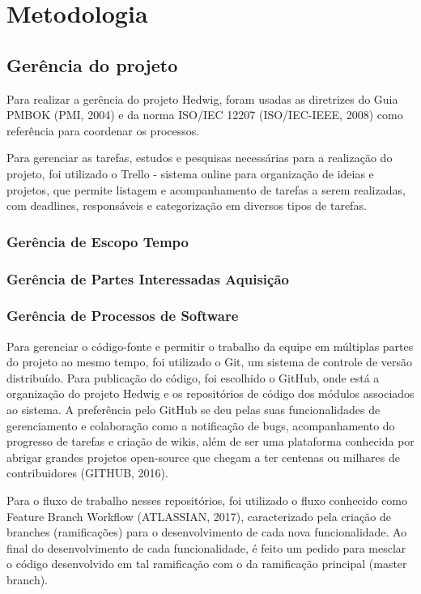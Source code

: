 \chapter{Metodologia}

\section{Gerência do projeto}
Para realizar a gerência do projeto Hedwig, foram usadas as diretrizes do Guia PMBOK (PMI, 2004) e da norma ISO/IEC 12207 (ISO/IEC-IEEE, 2008) como referência para coordenar os processos.

Para gerenciar as tarefas, estudos e pesquisas necessárias para a realização do projeto, foi utilizado o Trello - sistema online para organização de ideias e projetos, que permite listagem e acompanhamento de tarefas a serem realizadas, com deadlines, responsáveis e categorização em diversos tipos de tarefas.

\subsection{Gerência de Escopo Tempo}
\subsection{Gerência de Partes Interessadas Aquisição}
\subsection{Gerência de Processos de Software}
Para gerenciar o código-fonte e permitir o trabalho da equipe em múltiplas partes do projeto ao mesmo tempo, foi utilizado o Git, um sistema de controle de versão distribuído. Para publicação do código, foi escolhido o GitHub, onde está a organização do projeto Hedwig e os repositórios de código dos módulos associados ao sistema. A preferência pelo GitHub se deu pelas suas funcionalidades de gerenciamento e colaboração como a notificação de bugs, acompanhamento do progresso de tarefas e criação de wikis, além de ser uma plataforma conhecida por abrigar grandes projetos open-source que chegam a ter centenas ou milhares de contribuidores (GITHUB, 2016).

Para o fluxo de trabalho nesses repositórios, foi utilizado o fluxo conhecido como Feature Branch Workflow (ATLASSIAN, 2017), caracterizado pela criação de branches (ramificações) para o desenvolvimento de cada nova funcionalidade. Ao final do desenvolvimento de cada funcionalidade, é feito um pedido para mesclar o código desenvolvido em tal ramificação com o da ramificação principal (master branch).

